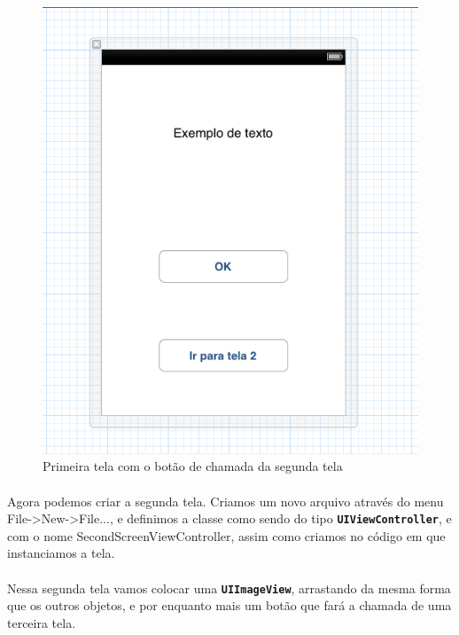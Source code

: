 \documentclass[a4paper,12pt,brazil,doubleside]{book}
\begin{document}
\begin{singlespace}
\begin{figure}[H]
  \centering
  \includegraphics[totalheight=0.5\textheight]{figuras/1/simulador3_tela1.png}
  \caption{Primeira tela com o botão de chamada da segunda tela}
  \label{fig:a}
\end{figure}

\bigskip

\paragraph{}Agora podemos criar a segunda tela. Criamos um novo arquivo através do menu File->New->File..., e definimos a classe como sendo do tipo \texttt{\textbf{UIViewController}}, e com o nome SecondScreenViewController, assim como criamos no código em que instanciamos a tela.
\paragraph{}Nessa segunda tela vamos colocar uma \texttt{\textbf{UIImageView}}, arrastando da mesma forma que os outros objetos, e por enquanto mais um botão que fará a chamada de uma terceira tela.


\end{singlespace}
\end{document}
